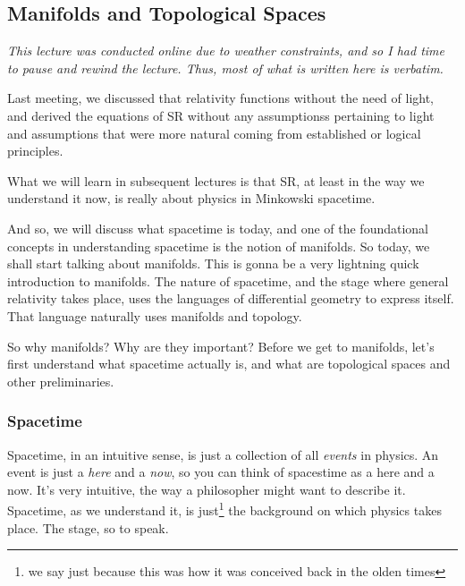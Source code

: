 \label{sec:Aspects-of-Differential-Geometry}

\subsection{Manifolds and Topological Spaces}

	\textit{This lecture was conducted online due to weather constraints, and so I had time to pause and rewind the lecture. Thus, most of what is written here is verbatim.}

	Last meeting, we discussed that relativity
	functions without the need of light, and derived the equations
	of SR without any assumptionss pertaining to light and assumptions
	that were more natural coming from established or logical 
	principles. 

	What we will learn in subsequent lectures is that SR, at least
	in the way we understand it now, is really about physics in 
	Minkowski spacetime. 

	And so, we will discuss what spacetime is today, and one of the foundational
	concepts in understanding spacetime is the notion of manifolds.
	So today, we shall start talking about manifolds. This is gonna be a very
	lightning quick introduction to manifolds. The nature of spacetime, and the 
	stage where general relativity takes place, uses the languages of differential geometry
	to express itself. That language naturally uses manifolds and topology.

	So why manifolds? Why are they important? Before we get to manifolds, let's first understand
	what spacetime actually is, and what are topological spaces and other preliminaries.

	\subsubsection{Spacetime}
		Spacetime, in an intuitive sense, is just a collection of all \textit{events} in physics. 
		An event is just a \textit{here} and a \textit{now}, so you can think 
		of spacestime as a here and a now. It's very intuitive, the way a philosopher
		might want to describe it. Spacetime, as we understand it, is just\footnote{we say just because this was how it was conceived back in the olden times}
		the background on which physics takes place. The stage, so to speak. 


